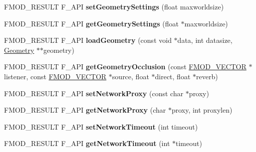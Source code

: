 \begin{DoxyCompactItemize}
\item 
\mbox{\label{classFMOD_1_1System_a421603edcdc170de9d72d8ab95ee0fbd}} 
F\+M\+O\+D\+\_\+\+R\+E\+S\+U\+LT F\+\_\+\+A\+PI {\bfseries set\+Geometry\+Settings} (float maxworldsize)
\item 
\mbox{\label{classFMOD_1_1System_a4466ede69006041d702b6ac5be162c57}} 
F\+M\+O\+D\+\_\+\+R\+E\+S\+U\+LT F\+\_\+\+A\+PI {\bfseries get\+Geometry\+Settings} (float $\ast$maxworldsize)
\item 
\mbox{\label{classFMOD_1_1System_af9aa1402e3132a854037625ea6fabd4e}} 
F\+M\+O\+D\+\_\+\+R\+E\+S\+U\+LT F\+\_\+\+A\+PI {\bfseries load\+Geometry} (const void $\ast$data, int datasize, \hyperlink{classFMOD_1_1Geometry}{Geometry} $\ast$$\ast$geometry)
\item 
\mbox{\label{classFMOD_1_1System_ac1c462ead8eef9cbb955a898cd1c64a9}} 
F\+M\+O\+D\+\_\+\+R\+E\+S\+U\+LT F\+\_\+\+A\+PI {\bfseries get\+Geometry\+Occlusion} (const \hyperlink{structFMOD__VECTOR}{F\+M\+O\+D\+\_\+\+V\+E\+C\+T\+OR} $\ast$listener, const \hyperlink{structFMOD__VECTOR}{F\+M\+O\+D\+\_\+\+V\+E\+C\+T\+OR} $\ast$source, float $\ast$direct, float $\ast$reverb)
\item 
\mbox{\label{classFMOD_1_1System_ab1368bd2bd2bcba58d4c70c385277bd1}} 
F\+M\+O\+D\+\_\+\+R\+E\+S\+U\+LT F\+\_\+\+A\+PI {\bfseries set\+Network\+Proxy} (const char $\ast$proxy)
\item 
\mbox{\label{classFMOD_1_1System_a6346a910caaff928a7498f2bfeaf8a69}} 
F\+M\+O\+D\+\_\+\+R\+E\+S\+U\+LT F\+\_\+\+A\+PI {\bfseries get\+Network\+Proxy} (char $\ast$proxy, int proxylen)
\item 
\mbox{\label{classFMOD_1_1System_aad7cb557e4992666cfc304dfbac6d04e}} 
F\+M\+O\+D\+\_\+\+R\+E\+S\+U\+LT F\+\_\+\+A\+PI {\bfseries set\+Network\+Timeout} (int timeout)
\item 
\mbox{\label{classFMOD_1_1System_aaabd940cb1f8768ae35bf68782d72ab6}} 
F\+M\+O\+D\+\_\+\+R\+E\+S\+U\+LT F\+\_\+\+A\+PI {\bfseries get\+Network\+Timeout} (int $\ast$timeout)
\item 
$$
\end{DoxyCompactItemize}
